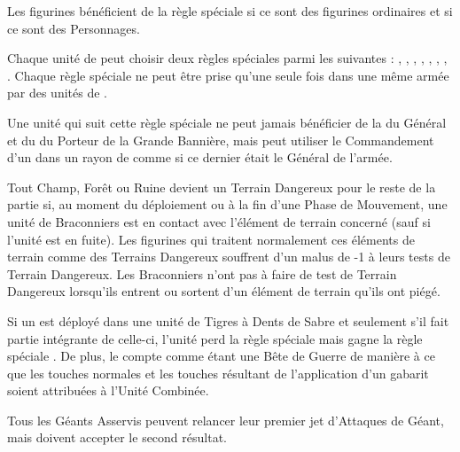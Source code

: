 \armyspecialruleentry{\meatavalanche}

Les figurines bénéficient de la règle spéciale  si ce sont des figurines ordinaires et  si ce sont des Personnages.

\armyspecialruleentry{\battlescarred}

Chaque unité de  peut choisir deux règles spéciales parmi les suivantes : \poisonedattacks , \vanguard , \thunderouscharge ,  , \bodyguard{}, \strider{}, \immunetopsychology , \swiftstride. Chaque règle spéciale ne peut être prise qu'une seule fois dans une même armée par des unités de .

\armyspecialruleentry{\wildbeasts}

Une unité qui suit cette règle spéciale ne peut jamais bénéficier de la \inspiringpresence du Général et du \holdyourground du Porteur de la Grande Bannière, mais peut utiliser le Commandement d'un  dans un rayon de  comme si ce dernier était le Général de l'armée.

\armyspecialruleentry{\itsatrap}

Tout Champ, Forêt ou Ruine devient un Terrain Dangereux pour le reste de la partie si, au moment du déploiement ou à la fin d'une Phase de Mouvement, une unité de Braconniers  est en contact avec l'élément de terrain concerné (sauf si l'unité est en fuite). Les figurines qui traitent normalement ces éléments de terrain comme des Terrains Dangereux souffrent d'un malus de -1 à leurs tests de Terrain Dangereux. Les Braconniers  n'ont pas à faire de test de Terrain Dangereux lorsqu'ils entrent ou sortent d'un élément de terrain qu'ils ont piégé.

\armyspecialruleentry{\leaderofthepack}

Si un  est déployé dans une unité de Tigres à Dents de Sabre et seulement s'il fait partie intégrante de celle-ci, l'unité perd la règle spéciale \insignificant mais gagne la règle spéciale \vanguard . De plus, le  compte comme étant une Bête de Guerre de manière à ce que les touches normales et les touches résultant de l'application d'un gabarit soient attribuées à l'Unité Combinée.

\armyspecialruleentry{\dowhatyouretold}

Tous les Géants Asservis peuvent relancer leur premier jet d'Attaques de Géant, mais doivent accepter le second résultat.

